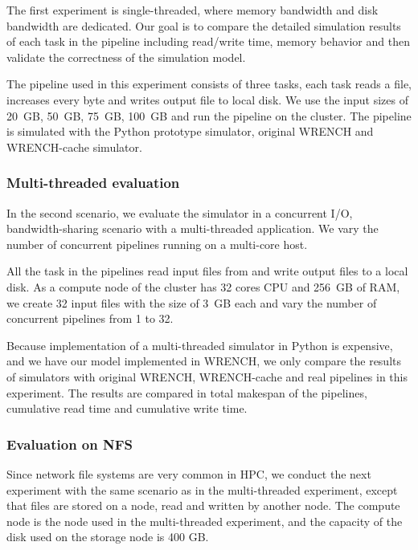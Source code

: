 \documentclass[conference]{IEEEtran}
\begin{document}
            The first experiment is single-threaded, where memory bandwidth
            and disk bandwidth are dedicated.
            Our goal is to compare the detailed simulation results of each task
            in the pipeline including read/write time, memory behavior and
            then validate the correctness of the simulation model.

            The pipeline used in this experiment consists of three tasks,
            each task reads a file, increases every byte and writes output file
            to local disk.
            We use the input sizes of 20~GB, 50~GB, 75~GB, 100~GB and run
            the pipeline on the cluster.
            The pipeline is simulated with the Python prototype simulator,
            original WRENCH and WRENCH-cache simulator.

            \subsubsection{Multi-threaded evaluation}

            In the second scenario, we evaluate the simulator in a concurrent I/O, 
            bandwidth-sharing scenario with a multi-threaded application.             
            We vary the number of concurrent pipelines running on a multi-core host.  
            
            All the task in the pipelines read input files from and write output files 
            to a local disk. 
            As a compute node of the cluster has 32 cores CPU and 256~GB of RAM,  
            we create 32 input files with the size of 3~GB each and vary the number of 
            concurrent pipelines from 1 to 32. 
            
            Because implementation of a multi-threaded simulator in Python is 
            expensive, and we have our model implemented in WRENCH, 
            we only compare the results of simulators with original WRENCH, 
            WRENCH-cache and real pipelines in this experiment. 
            The results are compared in total makespan of the pipelines, 
            cumulative read time and cumulative write time.
            
            \subsubsection{Evaluation on NFS}
            
            Since network file systems are very common in HPC, we conduct 
            the next experiment with the same scenario as in the multi-threaded experiment, 
            except that files are stored on a node, read and written by another node. 
            The compute node is the node used in the multi-threaded experiment, 
            and the capacity of the disk used on the storage node is 400 GB.
            
\end{document}
